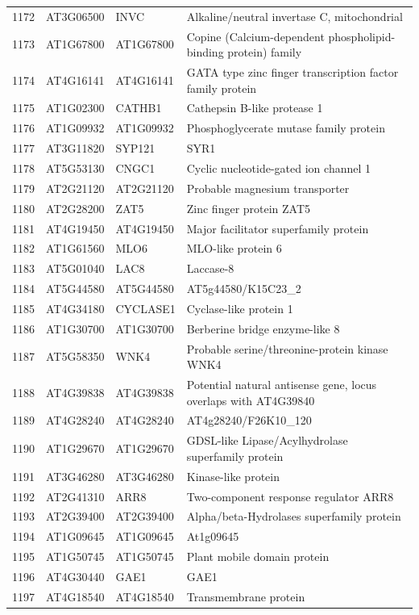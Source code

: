\documentclass[11pt]{article}
\begin{document}
\begin{center}
\begin{tabular}{rlll}
1172 & AT3G06500 & INVC & Alkaline/neutral invertase C, mitochondrial\\
1173 & AT1G67800 & AT1G67800 & Copine (Calcium-dependent phospholipid-binding protein) family\\
1174 & AT4G16141 & AT4G16141 & GATA type zinc finger transcription factor family protein\\
1175 & AT1G02300 & CATHB1 & Cathepsin B-like protease 1\\
1176 & AT1G09932 & AT1G09932 & Phosphoglycerate mutase family protein\\
1177 & AT3G11820 & SYP121 & SYR1\\
1178 & AT5G53130 & CNGC1 & Cyclic nucleotide-gated ion channel 1\\
1179 & AT2G21120 & AT2G21120 & Probable magnesium transporter\\
1180 & AT2G28200 & ZAT5 & Zinc finger protein ZAT5\\
1181 & AT4G19450 & AT4G19450 & Major facilitator superfamily protein\\
1182 & AT1G61560 & MLO6 & MLO-like protein 6\\
1183 & AT5G01040 & LAC8 & Laccase-8\\
1184 & AT5G44580 & AT5G44580 & AT5g44580/K15C23\_2\\
1185 & AT4G34180 & CYCLASE1 & Cyclase-like protein 1\\
1186 & AT1G30700 & AT1G30700 & Berberine bridge enzyme-like 8\\
1187 & AT5G58350 & WNK4 & Probable serine/threonine-protein kinase WNK4\\
1188 & AT4G39838 & AT4G39838 & Potential natural antisense gene, locus overlaps with AT4G39840\\
1189 & AT4G28240 & AT4G28240 & AT4g28240/F26K10\_120\\
1190 & AT1G29670 & AT1G29670 & GDSL-like Lipase/Acylhydrolase superfamily protein\\
1191 & AT3G46280 & AT3G46280 & Kinase-like protein\\
1192 & AT2G41310 & ARR8 & Two-component response regulator ARR8\\
1193 & AT2G39400 & AT2G39400 & Alpha/beta-Hydrolases superfamily protein\\
1194 & AT1G09645 & AT1G09645 & At1g09645\\
1195 & AT1G50745 & AT1G50745 & Plant mobile domain protein\\
1196 & AT4G30440 & GAE1 & GAE1\\
1197 & AT4G18540 & AT4G18540 & Transmembrane protein\\

\end{tabular}
\end{center}
\end{document}

